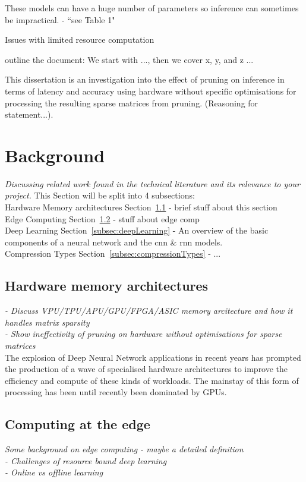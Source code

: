 \documentclass[11pt]{article}
\begin{document}
These models can have a huge number of parameters so inference can sometimes be impractical.
\autocite{chenDeepLearningMobile2020} - ``see Table 1"

Issues with limited resource computation \autocite{szeEfficientProcessingDeep2017}

outline the document: We start with ..., then we cover x, y, and z ...

This dissertation is an investigation into the effect of pruning on inference in terms of latency and accuracy using 
hardware without specific optimisations for processing the resulting sparse matrices from pruning. (Reasoning for statement...). 

\pagebreak
\section{Background}
\emph{Discussing related work found in the technical literature and its relevance to your
project.}
This Section will be split into 4 subsections:\\
Hardware Memory architectures Section~\ref{subsec:hardwareArch} - brief stuff about this section\\
Edge Computing Section~\ref{subsec:edgeComputing} - stuff about edge comp\\
Deep Learning Section~\ref{subsec:deepLearning} - An overview of the basic components of a neural network and the \acrshort{cnn} \& \acrshort{rnn} models.\\
Compression Types Section~\ref{subsec:compressionTypes} - ...\\


\subsection{Hardware memory architectures}\label{subsec:hardwareArch}
\emph{
- Discuss VPU/TPU/APU/GPU/FPGA/ASIC memory arcitecture and how it handles matrix sparsity\\
- Show ineffectivity of pruning on hardware without optimisations for sparse matrices\\
}
The explosion of Deep Neural Network applications in recent years has prompted the production of a wave of specialised hardware architectures to improve the efficiency and compute of these kinds of workloads. The mainstay of this form of processing has been until recently been dominated by GPUs.\\

\subsection{Computing at the edge}\label{subsec:edgeComputing}
\emph{Some background on edge computing - maybe a detailed definition\\
 - Challenges of resource bound deep learning\\
 - Online vs offline learning
 }
\end{document}
